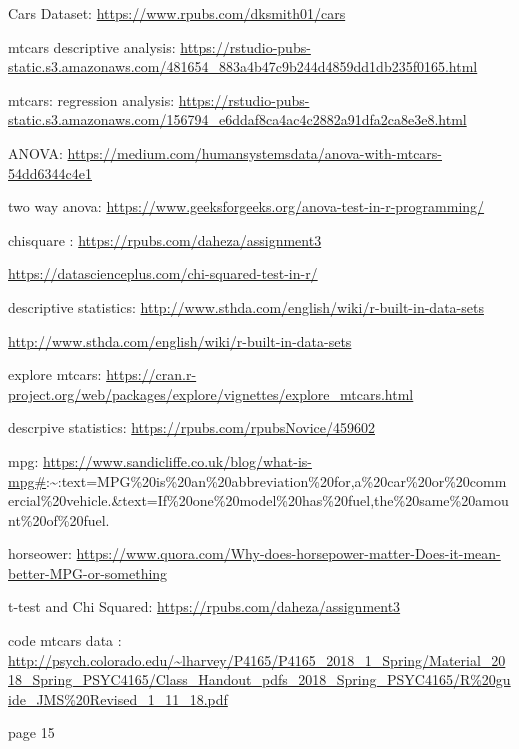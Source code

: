 \documentclass[
]{book}
\begin{document}
Cars Dataset: \url{https://www.rpubs.com/dksmith01/cars}

mtcars descriptive analysis: \url{https://rstudio-pubs-static.s3.amazonaws.com/481654_883a4b47c9b244d4859dd1db235f0165.html}

mtcars: regression analysis: \url{https://rstudio-pubs-static.s3.amazonaws.com/156794_e6ddaf8ca4ac4c2882a91dfa2ca8e3e8.html}

ANOVA: \url{https://medium.com/humansystemsdata/anova-with-mtcars-54dd6344c4e1}

two way anova: \url{https://www.geeksforgeeks.org/anova-test-in-r-programming/}

chisquare : \url{https://rpubs.com/daheza/assignment3}

\url{https://datascienceplus.com/chi-squared-test-in-r/}

descriptive statistics: \url{http://www.sthda.com/english/wiki/r-built-in-data-sets}

\url{http://www.sthda.com/english/wiki/r-built-in-data-sets}

explore mtcars: \url{https://cran.r-project.org/web/packages/explore/vignettes/explore_mtcars.html}

descrpive statistics: \url{https://rpubs.com/rpubsNovice/459602}

mpg: \url{https://www.sandicliffe.co.uk/blog/what-is-mpg\#}:\textasciitilde:text=MPG\%20is\%20an\%20abbreviation\%20for,a\%20car\%20or\%20commercial\%20vehicle.\&text=If\%20one\%20model\%20has\%20fuel,the\%20same\%20amount\%20of\%20fuel.

horseower: \url{https://www.quora.com/Why-does-horsepower-matter-Does-it-mean-better-MPG-or-something}

t-test and Chi Squared: \url{https://rpubs.com/daheza/assignment3}

code mtcars data : \url{http://psych.colorado.edu/~lharvey/P4165/P4165_2018_1_Spring/Material_2018_Spring_PSYC4165/Class_Handout_pdfs_2018_Spring_PSYC4165/R\%20guide_JMS\%20Revised_1_11_18.pdf}

page 15

  
\end{document}
